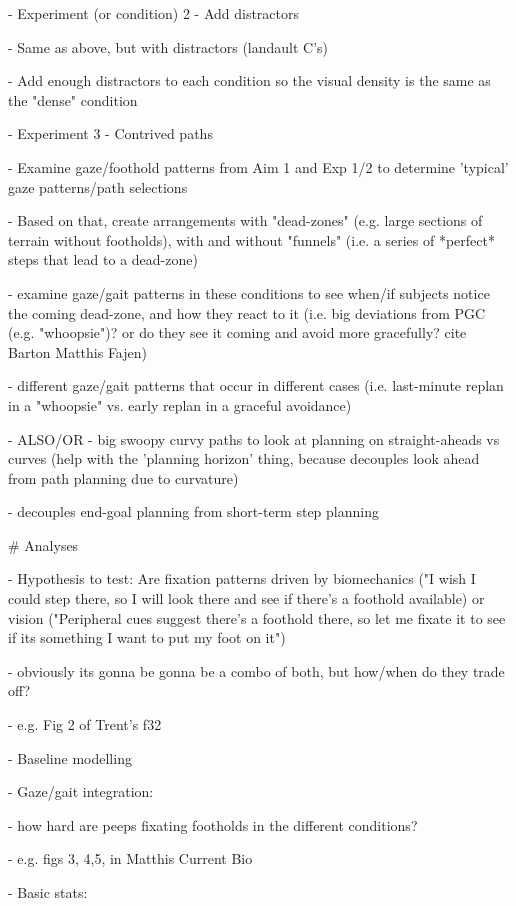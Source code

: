 - Experiment (or condition) 2 - Add distractors

  - Same as above, but with distractors (landault C's)

  - Add enough distractors to each condition so the visual density is the same as the "dense" condition

- Experiment 3 - Contrived paths

  - Examine gaze/foothold patterns from Aim 1 and Exp 1/2 to determine 'typical' gaze patterns/path selections
  
  - Based on that, create arrangements with "dead-zones" (e.g. large sections of terrain without footholds), with and without "funnels" (i.e. a series of *perfect* steps that lead to a dead-zone)
  
    - examine gaze/gait patterns in these conditions to see when/if subjects notice the coming dead-zone, and how they react to it (i.e. big deviations from PGC (e.g. "whoopsie")? or do they see it coming and avoid more gracefully? cite Barton Matthis Fajen)
    
    - different gaze/gait patterns that occur in different cases (i.e. last-minute replan in a "whoopsie" vs. early replan in a graceful avoidance)
  
  - ALSO/OR - big swoopy curvy paths to look at planning on straight-aheads vs curves (help with the 'planning horizon' thing, because decouples look ahead from path planning due to curvature)
  
    - decouples end-goal planning from short-term step planning


# Analyses

- Hypothesis to test: Are fixation patterns driven by biomechanics ("I wish I could step there, so I will look there and see if there's a foothold available) or vision ("Peripheral cues suggest there's a foothold there, so let me fixate it to see if its something I want to put my foot on it")

    - obviously its gonna be gonna be a combo of both, but how/when do they trade off? 
  
    - e.g. Fig 2 of Trent's f32

- Baseline modelling

  - Gaze/gait integration:
  
    - how hard are peeps fixating footholds in the different conditions?
    
        - e.g. figs 3, 4,5, in Matthis Current Bio

  - Basic stats:
  
